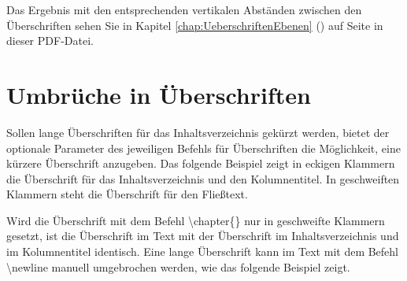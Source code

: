 Das Ergebnis mit den entsprechenden vertikalen Abständen zwischen den Überschriften sehen Sie in Kapitel \ref{chap:UeberschriftenEbenen} (\glqq {}\grqq{}) auf Seite \pageref{chap:UeberschriftenEbenen} in dieser PDF-Datei.





\section{Umbrüche in Überschriften}
\label{sec:Umbrüche in Überschriften}
Sollen lange Überschriften für das Inhaltsverzeichnis gekürzt werden, bietet der optionale Parameter des jeweiligen Befehls für Überschriften die Möglichkeit, eine kürzere Überschrift anzugeben. Das folgende Beispiel zeigt in eckigen Klammern die Überschrift für das Inhaltsverzeichnis und den Kolumnentitel. In geschweiften Klammern steht die Überschrift für den Fließtext. 


Wird die Überschrift mit dem Befehl \glqq \textbackslash chapter\{\}\grqq{} nur in geschweifte Klammern gesetzt, ist die Überschrift im Text mit der Überschrift im Inhaltsverzeichnis und im Kolumnentitel identisch. Eine lange Überschrift kann im Text mit dem Befehl \glqq \textbackslash newline\grqq{} manuell umgebrochen werden, wie das folgende Beispiel zeigt.




